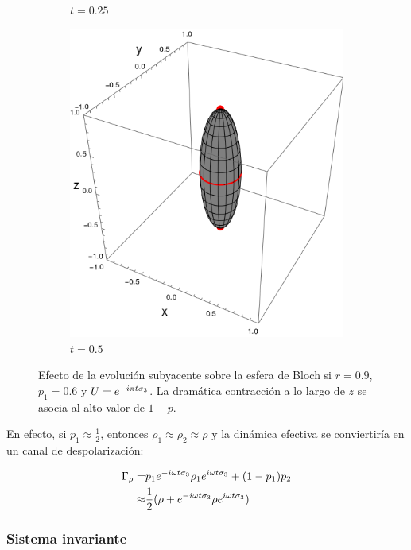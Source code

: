 \begin{figure}[ht!]
\begin{subfigure}{0.32\textwidth}
      \caption{$t=0.25$}
    \end{subfigure}
    \begin{subfigure}{0.32\textwidth}
      \centering
      \includegraphics[width=0.9\linewidth]{chapter3/figures_separable/U1xU2_H1=Pi(sz)_H2=Id_z=0.9_p=0.6t=0.5.png}
      \caption{$t=0.5$}
    \end{subfigure}
    \caption{Efecto de la evolución subyacente sobre la esfera de Bloch si $r=0.9$, $p_{1}=0.6$ y $U=e^{-i\pi t \sigma_{3}}$. La dramática contracción a lo largo de $z$ se asocia al alto valor de $1-p$.}
    \label{fig:FaseChangeSequence}
\end{figure}

En efecto, si $p_{1}\approx\frac{1}{2}$, entonces $\rho_{1}\approx\rho_{2}\approx\rho$ y la dinámica efectiva se conviertiría en un canal de despolarización:

\begin{align*}
    \Gamma_{\rho}=&p_{1}e^{-i\omega t \sigma_{3}}\rho_{1}e^{i\omega t \sigma_{3}}+(1-p_{1})p_{2}\\
    \approx&\frac{1}{2}(\rho+e^{-i\omega t \sigma_{3}}\rho e^{i\omega t \sigma_{3}})
\end{align*}

\subsubsection{Sistema invariante}

